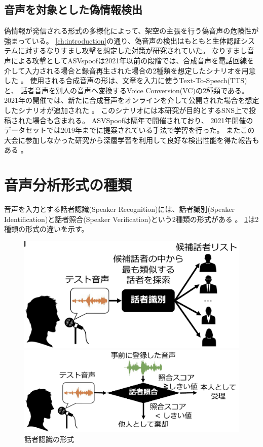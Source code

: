 \subsection{音声を対象とした偽情報検出}
偽情報が発信される形式の多様化によって、架空の主張を行う偽音声の危険性が強まっている。
\cref{ch:introduction}の通り、偽音声の検出はもともと生体認証システムに対するなりすまし攻撃を想定した対策が研究されていた。
なりすまし音声による攻撃としてASVspoofは2021年以前の段階では、合成音声を電話回線を介して入力される場合と録音再生された場合の2種類を想定したシナリオを用意した \cite{7858696}。
使用される合成音声の形は、文章を入力に使うText-To-Speech(TTS)と、
話者音声を別人の音声へ変換するVoice Conversion(VC)の2種類である。
2021年の開催では、新たに合成音声をオンラインを介して公開された場合を想定したシナリオが追加された \cite{yamagishi21_asvspoof}。
このシナリオには本研究が目的とするSNS上で投稿された場合も含まれる。
ASVSpoofは隔年で開催されており、
2021年開催のデータセットでは2019年までに提案されている手法で学習を行った。
またこの大会に参加しなかった研究から深層学習を利用して良好な検出性能を得た報告もある \cite{10.1145/3394171.3413716}。

\section{音声分析形式の種類}
音声を入力とする話者認識(Speaker Recognition)には、話者識別(Speaker Identification)と話者照合(Speaker Verification)という2種類の形式がある \cite{FURUI1997859,628714,5745552}。
\cref{fig:speaker_recog}は2種類の形式の違いを示す。

\begin{figure}[p]
    \centering
    \begin{minipage}{0.9\linewidth}
        \centering
        \includegraphics[width=0.8\linewidth]{figures/sd.png}
    \end{minipage}
    \begin{minipage}{0.9\linewidth}
        \centering
        \includegraphics[width=0.8\linewidth]{figures/sv.png}
    \end{minipage}
    \caption{話者認識の形式 \cite{俵直弘2022}}
    \label{fig:speaker_recog}
\end{figure}

